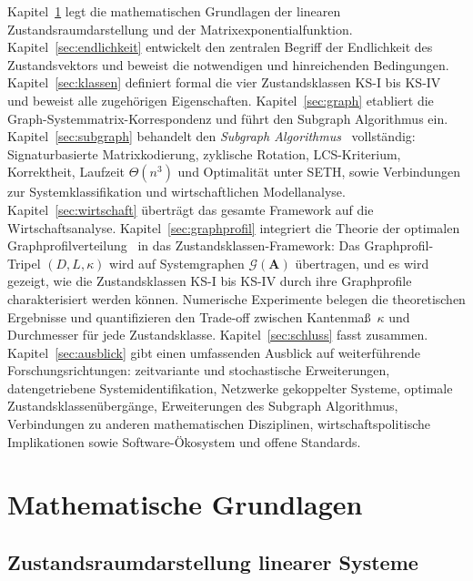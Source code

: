 ﻿\documentclass[12pt, a4paper, titlepage]{report}
\theoremstyle{definition}
\theoremstyle{remark}
\newcommand{\vA}{\bm{A}}
\begin{document}
Kapitel~\ref{sec:grundlagen} legt die mathematischen Grundlagen der linearen
Zustandsraumdarstellung und der Matrixexponentialfunktion. Kapitel~\ref{sec:endlichkeit}
entwickelt den zentralen Begriff der Endlichkeit des Zustandsvektors und beweist die
notwendigen und hinreichenden Bedingungen. Kapitel~\ref{sec:klassen} definiert formal
die vier Zustandsklassen KS-I bis KS-IV und beweist alle zugehörigen Eigenschaften.
Kapitel~\ref{sec:graph} etabliert die Graph-Systemmatrix-Korrespondenz und führt den
Subgraph Algorithmus ein. Kapitel~\ref{sec:subgraph} behandelt den
\emph{Subgraph Algorithmus}~\citep{epp2026subgraph} vollständig: Signaturbasierte
Matrixkodierung, zyklische Rotation, LCS-Kriterium, Korrektheit, Laufzeit $\Theta(n^3)$
und Optimalität unter SETH, sowie Verbindungen zur Systemklassifikation und
wirtschaftlichen Modellanalyse. Kapitel~\ref{sec:wirtschaft} überträgt das gesamte
Framework auf die Wirtschaftsanalyse.
Kapitel~\ref{sec:graphprofil} integriert die Theorie der optimalen
Graphprofilverteilung~\citep{epp2026graphs} in das Zustandsklassen-Framework:
Das Graphprofil-Tripel $(D, L, \kappa)$ wird auf Systemgraphen $\mathcal{G}(\vA)$
übertragen, und es wird gezeigt, wie die Zustandsklassen KS-I bis KS-IV durch
ihre Graphprofile charakterisiert werden können. Numerische Experimente belegen die
theoretischen Ergebnisse und quantifizieren den Trade-off zwischen Kantenmaß~$\kappa$
und Durchmesser für jede Zustandsklasse.
Kapitel~\ref{sec:schluss} fasst zusammen.
Kapitel~\ref{sec:ausblick} gibt einen umfassenden Ausblick auf weiterführende
Forschungsrichtungen: zeitvariante und stochastische Erweiterungen, datengetriebene
Systemidentifikation, Netzwerke gekoppelter Systeme, optimale Zustandsklassenübergänge,
Erweiterungen des Subgraph Algorithmus, Verbindungen zu anderen mathematischen
Disziplinen, wirtschaftspolitische Implikationen sowie Software-Ökosystem und
offene Standards.

\chapter{Mathematische Grundlagen}
\label{sec:grundlagen}

\section{Zustandsraumdarstellung linearer Systeme}
\end{document}
